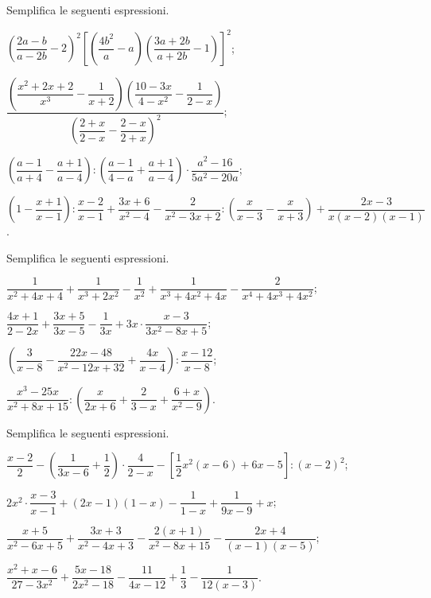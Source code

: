 \begin{esercizio}[\Ast]
\label{ese:14.45}
Semplifica le seguenti espressioni.
\begin{enumeratea}
 \item $\left(\dfrac{2a-b}{a-2b}-2\right)^{2}\left[\left(\dfrac{4b^{2}}{a}-a\right)\left(\dfrac{3a+2b}{a+2b}-1\right)\right]^{2}$;
 \item $\dfrac{\left(\dfrac{x^{2}+2x+2}{x^{3}}-\dfrac{1}{x+2}\right)\left(\dfrac{10-3x}{4-x^{2}}-\dfrac{1}{2-x}\right)}{\left(\dfrac{2+x}{2-x}-\dfrac{2-x}{2+x}\right)^{2}}$;
 \item $\left(\dfrac{a-1}{a+4}-\dfrac{a+1}{a-4}\right):\left(\dfrac{a-1}{4-a}+\dfrac{a+1}{a-4}\right)\cdot {\dfrac{a^{2}-16}{5a^{2}-20a}}$;
 \item $\left(1-\dfrac{x+1}{x-1}\right):\dfrac{x-2}{x-1}+\dfrac{3x+6}{x^{2}-4}-\dfrac{2}{x^{2}-3x+2}: {\left(\dfrac{x}{x-3}-\dfrac{x}{x+3}\right)}+\dfrac{2x-3}{x(x-2)(x-1)}$.
\end{enumeratea}
\end{esercizio}

\begin{esercizio}[\Ast]
\label{ese:14.46}
Semplifica le seguenti espressioni.
\begin{enumeratea}
 \item $\dfrac{1}{x^{2}+4x+4}+\dfrac{1}{x^{3}+2x^{2}}-\dfrac{1}{x^{2}}+\dfrac{1}{x^{3}+4x^{2}+4x}-\dfrac{2}{x^{4}+4x^{3}+4x^{2}}$;
 \item $\dfrac{4x+1}{2-2x}+\dfrac{3x+5}{3x-5}-\dfrac{1}{3x}+3x\cdot {\dfrac{x-3}{3x^{2}-8x+5}}$;
 \item $\left(\dfrac{3}{x-8}-\dfrac{22x-48}{x^{2}-12x+32}+\dfrac{4x}{x-4}\right):\dfrac{x-12}{x-8}$;
 \item $\dfrac{x^{{3}}-25x}{x^{{2}}+8x+15}:\left(\dfrac{x}{2x+6}+\dfrac{2}{3-x}+\dfrac{6+x}{x^{{2}}-9}\right)$.
\end{enumeratea}
\end{esercizio}

\begin{esercizio}[\Ast]
\label{ese:14.47}
Semplifica le seguenti espressioni.
\begin{enumeratea}
 \item $\dfrac{x-2}{2}-\left(\dfrac{1}{3x-6}+\dfrac{1}{2}\right)\cdot {\dfrac{4}{2-x}}-\left[\dfrac{1}{2}x^{2}(x-6)+6x-5\right]:(x-2)^{2}$;
 \item $2x^{2}\cdot {\dfrac{x-3}{x-1}}+(2x-1)(1-x)-\dfrac{1}{1-x}+\dfrac{1}{9x-9}+x$;
 \item $\dfrac{x+5}{x^{2}-6x+5}+\dfrac{3x+3}{x^{2}-4x+3}-\dfrac{2(x+1)}{x^{2}-8x+15}-\dfrac{2x+4}{(x-1)(x-5)}$;
 \item $\dfrac{x^{2}+x-6}{27-3x^{2}}+\dfrac{5x-18}{2x^{2}-18}-\dfrac{11}{4x-12}+\dfrac{1}{3}-\dfrac{1}{12(x-3)}$.
\end{enumeratea}
\end{esercizio}


